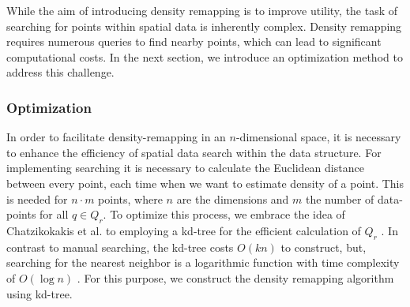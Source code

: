 While the aim of introducing density remapping is to improve utility, the task of searching for points within spatial data is inherently complex. Density remapping requires numerous queries to find nearby points, which can lead to significant computational costs. In the next section, we introduce an optimization method to address this challenge.



\subsubsection{Optimization}
In order to facilitate density-remapping in an $n$-dimensional space, it is necessary to enhance the efficiency of spatial data search within the data structure. 
For implementing searching it is necessary to calculate the Euclidean distance between every point, each time when we want to estimate density of a point.
This is needed for $n \cdot m$ points, where $n$ are the dimensions and $m$ the number of data-points for all $q \in Q_r$.
To optimize this process, we embrace the idea of Chatzikokakis et al. to employing a kd-tree for the efficient calculation of $Q_r$ \citep{chatzikokolakis_efficient_2017}.
In contrast to manual searching, the kd-tree costs $O(kn)$ to construct, but, searching for the nearest neighbor is a logarithmic function with time complexity of $O(\log n)$ \citep{washington_k-d_2002}.
For this purpose, we construct the density remapping algorithm using kd-tree. \newline

